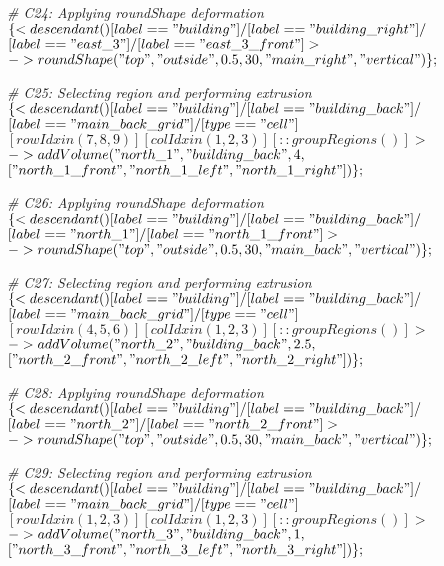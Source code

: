 \noindent \textit{\# C24: Applying roundShape deformation}\\
$\{< descendant() [label=="building"] / [label=="building\_right"] / $\\
$[label=="east\_3"] / [label=="east\_3\_front"] > $\\
$-> roundShape("top", "outside", 0.5, 30, "main\_right", "vertical")\};$

\noindent \textit{\# C25: Selecting region and performing extrusion}\\
$\{< descendant() [label=="building"] / [label=="building\_back"] / $\\
$[label=="main\_back\_grid"] / [type=="cell"] $\\
$[rowIdx in (7, 8, 9)] [colIdx in (1, 2, 3)] [::groupRegions()] >$ \\
$-> addVolume("north\_1", "building\_back", 4, $\\
$["north\_1\_front", "north\_1\_left", "north\_1\_right"])\};$

\noindent \textit{\# C26: Applying roundShape deformation}\\
$\{< descendant() [label=="building"] / [label=="building\_back"] / $\\
$[label=="north\_1"] / [label=="north\_1\_front"] > $\\
$-> roundShape("top", "outside", 0.5, 30, "main\_back", "vertical")\};$

\noindent \textit{\# C27: Selecting region and performing extrusion}\\
$\{< descendant() [label=="building"] / [label=="building\_back"] / $\\
$[label=="main\_back\_grid"] / [type=="cell"] $\\
$[rowIdx in (4, 5, 6)] [colIdx in (1, 2, 3)] [::groupRegions()] > $\\
$-> addVolume("north\_2", "building\_back", 2.5, $\\
$["north\_2\_front", "north\_2\_left", "north\_2\_right"])\};$

\noindent \textit{\# C28: Applying roundShape deformation}\\
$\{< descendant() [label=="building"] / [label=="building\_back"] / $\\
$[label=="north\_2"] / [label=="north\_2\_front"] > $\\
$-> roundShape("top", "outside", 0.5, 30, "main\_back", "vertical")\};$

\noindent \textit{\# C29: Selecting region and performing extrusion}\\
$\{< descendant() [label=="building"] / [label=="building\_back"] / $\\
$[label=="main\_back\_grid"] / [type=="cell"] $\\
$[rowIdx in (1, 2, 3)] [colIdx in (1, 2, 3)] [::groupRegions()] > $\\
$-> addVolume("north\_3", "building\_back", 1, $\\
$["north\_3\_front", "north\_3\_left", "north\_3\_right"])\};$


